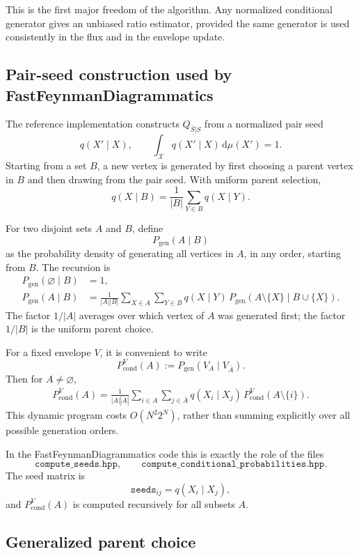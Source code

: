 \documentclass[11pt]{article}
\newcommand{\dd}{\mathrm{d}}
\newcommand{\1}{\mathbf{1}}
\newcommand{\calX}{\mathcal{X}}
\newcommand{\Pgen}{P_{\mathrm{gen}}}
\newcommand{\Pcond}{P_{\mathrm{cond}}}
\newcommand{\card}[1]{\left|#1\right|}
\begin{document}
This is the first major freedom of the algorithm.  Any normalized conditional
generator gives an unbiased ratio estimator, provided the same generator is
used consistently in the flux and in the envelope update.

\subsection{Pair-seed construction used by FastFeynmanDiagrammatics}

The reference implementation constructs \(Q_{\bar S|S}\) from a normalized
pair seed
\[
  q(X'\mid X),\qquad
  \int_{\calX}q(X'\mid X)\,\dd\mu(X')=1.
\]
Starting from a set \(B\), a new vertex is generated by first choosing a
parent vertex in \(B\) and then drawing from the pair seed.  With uniform
parent selection,
\[
  q(X\mid B)
  =
  \frac{1}{\card{B}}\sum_{Y\in B} q(X\mid Y).
\]

For two disjoint sets \(A\) and \(B\), define
\[
  \Pgen(A\mid B)
\]
as the probability density of generating all vertices in \(A\), in any order,
starting from \(B\).  The recursion is
\begin{align}
  \Pgen(\varnothing\mid B)&=1,\\
  \Pgen(A\mid B)
  &=
  \frac{1}{\card{A}\card{B}}
  \sum_{X\in A}\sum_{Y\in B}
  q(X\mid Y)\,
  \Pgen(A\setminus\{X\}\mid B\cup\{X\}).
  \label{eq:pgen-recursion}
\end{align}
The factor \(1/\card{A}\) averages over which vertex of \(A\) was generated
first; the factor \(1/\card{B}\) is the uniform parent choice.

For a fixed envelope \(V\), it is convenient to write
\[
  \Pcond^V(A)
  :=
  \Pgen(V_A\mid V_{\bar A}).
\]
Then for \(A\ne\varnothing\),
\begin{align}
  \Pcond^V(A)
  =
  \frac{1}{\card{A}\card{\bar A}}
  \sum_{i\in A}\sum_{j\in \bar A}
  q(X_i\mid X_j)\,
  \Pcond^V(A\setminus\{i\}).
  \label{eq:pcond-recursion}
\end{align}
This dynamic program costs \(O(N^2 2^N)\), rather than summing explicitly over
all possible generation orders.

In the FastFeynmanDiagrammatics code this is exactly the role of the files
\[
  \texttt{compute\_seeds.hpp},\qquad
  \texttt{compute\_conditional\_probabilities.hpp}.
\]
The seed matrix is
\[
  \texttt{seeds}_{ij}=q(X_i\mid X_j),
\]
and \(\Pcond^V(A)\) is computed recursively for all subsets \(A\).

\subsection{Generalized parent choice}
\end{document}
